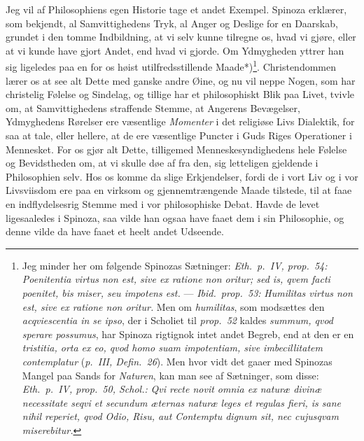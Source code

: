 \documentclass[12pt,a4paper]{book}
\newcommand{\apage}[1]{\marginnote{\footnotesize\textit{[#1]}}}
\begin{document}
Jeg vil af Philosophiens egen Historie tage et andet Exempel. Spinoza
erklærer, som bekjendt, al Samvittighedens Tryk, al Anger og Deslige
for en Daarskab, grundet i den tomme Indbildning, \apage{61} at vi selv kunne
tilregne os, hvad vi gjøre, eller at vi kunde have gjort Andet, end
hvad vi gjorde. Om Ydmygheden yttrer han sig ligeledes paa en for os
høist utilfredsstillende Maade*)\footnote{Jeg minder her om følgende
Spinozas Sætninger: \textit{Eth.\ p.\ IV, prop.\ 54:} \textit{Poenitentia virtus
non est, sive ex ratione non oritur; sed is, qvem facti poenitet, bis
miser, seu impotens est.} --- \textit{Ibid.\ prop.\ 53:} \textit{Humilitas
virtus non est, sive ex ratione non oritur.} Men om \textit{humilitas},
som modsættes den \textit{acqviescentia \emph{in se ipso}}, der i Scholiet til
\textit{prop.\ 52} kaldes \textit{summum, qvod sperare possumus}, har Spinoza
rigtignok intet andet Begreb, end at den er en \textit{\emph{tristitia}, orta
ex eo, qvod homo suam impotentiam, sive imbecillitatem contemplatur}
(\textit{p.\ III, Defin.\ 26}). Men hvor vidt det gaaer med Spinozas Mangel paa
Sands for \emph{Naturen}, kan man see af Sætninger, som disse: \textit{Eth.\ p.\ IV,
prop.\ 50, Schol.:} \textit{Qvi recte novit omnia ex naturæ divinæ
necessitate seqvi et secundum æternas naturæ leges et regulas fieri, is
sane nihil reperiet, qvod Odio, Risu, aut Contemptu dignum sit, nec
cujusqvam miserebitur.}}. Christendommen lærer os at see alt Dette med
ganske andre Øine, og nu vil neppe Nogen, som har christelig Følelse og
Sindelag, og tillige har et philosophiskt Blik paa Livet, tvivle om, at
Samvittighedens straffende Stemme, at Angerens Bevægelser, Ydmyghedens
Rørelser ere væsentlige \emph{Momenter} i det religiøse Livs Dialektik, for
saa at tale, eller hellere, at de ere væsentlige Puncter i Guds Riges
Operationer i Mennesket. For os gjør alt Dette, tilligemed
Menneskesyndighedens hele Følelse og Bevidstheden om, at vi skulle døe
af fra den, sig letteligen gjeldende i Philosophien selv. Hos os komme
da slige Erkjendelser, fordi de i vort Liv og i vor Livsviisdom ere paa
en virksom og gjennemtrængende Maade tilstede, til at faae en
indflydelsesrig Stemme med i vor philosophiske Debat. Havde de levet
ligesaaledes i Spinoza, saa vilde han ogsaa have faaet dem i sin
Philosophie, og denne vilde da have faaet et heelt andet Udseende.
\end{document}

